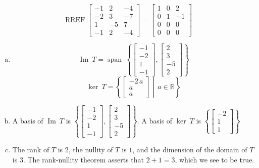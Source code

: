 \begin{exerciseAnswer} 


\[\operatorname{RREF} \left[\begin{array}{ccc}
-1 & 2 & -4 \\
-2 & 3 & -7 \\
1 & -5 & 7 \\
-1 & 2 & -4
\end{array}\right] = \left[\begin{array}{ccc}
1 & 0 & 2 \\
0 & 1 & -1 \\
0 & 0 & 0 \\
0 & 0 & 0
\end{array}\right] \]


\begin{enumerate}[(a)]
\item \[\operatorname{Im}\ T = \operatorname{span}\  \left\{ \left[\begin{array}{c}
-1 \\
-2 \\
1 \\
-1
\end{array}\right] , \left[\begin{array}{c}
2 \\
3 \\
-5 \\
2
\end{array}\right] \right\} \]\[\operatorname{ker}\ T =  \left\{ \left[\begin{array}{c}
-2 \, a \\
a \\
a
\end{array}\right] \middle|\,a\in\mathbb{R}\right\} \]
\item  A basis of \(\operatorname{Im}\ T\) is \( \left\{ \left[\begin{array}{c}
-1 \\
-2 \\
1 \\
-1
\end{array}\right] , \left[\begin{array}{c}
2 \\
3 \\
-5 \\
2
\end{array}\right] \right\} \). A basis of \(\operatorname{ker}\ T\) is \( \left\{ \left[\begin{array}{c}
-2 \\
1 \\
1
\end{array}\right] \right\} \)
\item  The rank of \(T\) is \( 2 \), the nullity of \(T\) is \( 1 \), and the dimension of the domain of \(T\) is \( 3 \). The rank-nullity theorem asserts that \( 2 + 1 = 3 \), which we see to be true. 
\end{enumerate}
    
\end{exerciseAnswer}
    
